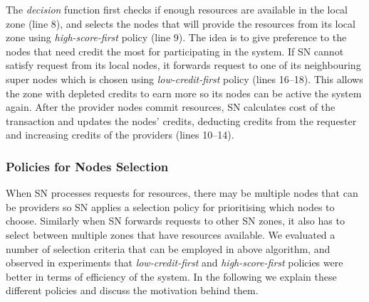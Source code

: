The \emph{decision} function first checks if enough resources are available in the local zone (line 8), and selects the nodes that will provide the resources from its local zone using \emph{high-score-first} policy (line 9).
The idea is to give preference to the nodes that need credit the most for participating in the system.
If SN cannot satisfy request from its local nodes, it forwards request to one of its neighbouring super nodes which is chosen using \emph{low-credit-first} policy (lines 16--18).
This allows the zone with depleted credits to earn more so its nodes can be active the system again. 
After the provider nodes commit resources, SN calculates cost of the transaction and updates the 
nodes' credits, deducting credits from the requester and increasing credits of the providers (lines 10--14).


\subsubsection{Policies for Nodes Selection}
When SN processes requests for resources, there may be multiple nodes that can be providers so SN applies a selection policy for prioritising which nodes to choose.
Similarly when SN forwards requests to other SN zones, it also has to select between multiple zones that have resources available.
We evaluated a number of selection criteria that can be employed in above algorithm, and observed in experiments that \emph{low-credit-first} and \emph{high-score-first} policies were better in terms of efficiency of the system. 
In the following we explain these different policies and discuss the motivation behind them.

